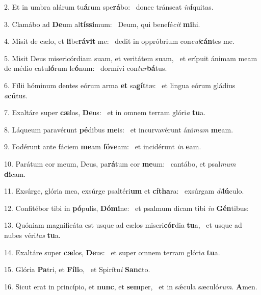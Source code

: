 2. Et in umbra alárum tu\textbf{á}rum spe\textbf{rá}bo: \ast\  donec tránseat \textit{in}\textbf{í}quitas.\

3. Clamábo ad \textbf{De}um al\textbf{tís}\textbf{si}mum: \ast\  Deum, qui benefé\textit{cit} \textbf{mi}hi.\

4. Misit de cælo, et \textbf{li}be\textbf{rá}\textbf{vit} me: \ast\  dedit in oppróbrium con\textit{cul}\textbf{cán}tes me.\

5. Misit Deus misericórdiam suam, et veritátem suam, \dag\  et erípuit ánimam meam de médio catu\textbf{ló}rum le\textbf{ó}num: \ast\  dormívi con\textit{tur}\textbf{bá}tus.\

6. Fílii hóminum dentes eórum arma \textbf{et} sa\textbf{gít}tæ: \ast\  et lingua eórum gládius \textit{a}\textbf{cú}tus.\

7. Exaltáre super \textbf{cæ}los, \textbf{De}us: \ast\  et in omnem terram glóri\textit{a} \textbf{tu}a.\

8. Láqueum paravérunt \textbf{pé}dibus \textbf{me}is: \ast\  et incurvavérunt áni\textit{mam} \textbf{me}am.\

9. Fodérunt ante fáciem \textbf{me}am \textbf{fó}\textbf{ve}am: \ast\  et incidérunt \textit{in} \textbf{e}am.\

10. Parátum cor meum, Deus, pa\textbf{rá}tum cor \textbf{me}um: \ast\  cantábo, et psal\textit{mum} \textbf{di}cam.\

11. Exsúrge, glória mea, exsúrge psaltéri\textbf{um} et \textbf{cí}\textbf{tha}ra: \ast\  exsúrgam \textit{di}\textbf{lú}culo.\

12. Confitébor tibi in \textbf{pó}pulis, \textbf{Dó}\textbf{mi}ne: \ast\  et psalmum dicam tibi \textit{in} \textbf{Gén}tibus:\

13. Quóniam magnificáta est usque ad cælos miseri\textbf{cór}dia \textbf{tu}a, \ast\  et usque ad nubes véri\textit{tas} \textbf{tu}a.\

14. Exaltáre super \textbf{cæ}los, \textbf{De}us: \ast\  et super omnem terram glóri\textit{a} \textbf{tu}a.\

15. Glória \textbf{Pa}tri, et \textbf{Fí}\textbf{li}o, \ast\  et Spirítu\textit{i} \textbf{Sanc}to.\

16. Sicut erat in princípio, et \textbf{nunc}, et \textbf{sem}per, \ast\  et in sǽcula sæculó\textit{rum}. \textbf{A}men.\

